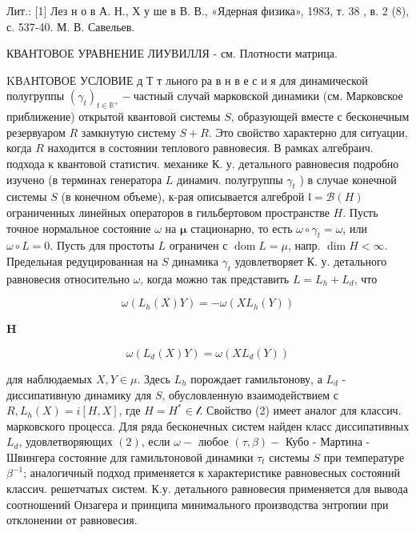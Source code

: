 \documentclass[10pt]{article}
\begin{document}
Лит.: [1] Лез н о в А. Н., Х у ше в В. В., «Ядерная физика», 1983, т. 38 , в. 2 (8), с. 537-40. М. В. Савельев.



КВАНТОВОЕ УРАВНЕНИЕ ЛИУВИЛЛЯ - см. Плотности матрица.



KВAНТОВОЕ УСЛОВИЕ д Т т льного ра в н в е с и я для динамической полугруппы $\left(\gamma_{t}\right)_{t \in \mathbb{R}^{+}}-$частный случай марковской динамики (см. Марковское приближение) открытой квантовой системы $S$, образующей вместе с бесконечным резервуаром $R$ замкнутую систему $S+R$. Это свойство характерно для ситуации, когда $R$ находится в состоянии теплового равновесия. В рамках алгебраич. подхода к квантовой статистич. механике К. у. детального равновесия подробно изучено (в терминах генератора $L$ динамич. полугруппы $\gamma_{t}$ ) в случае конечной системы $S$ (в конечном объеме), к-рая описывается алгеброй $\mathfrak{l}=\mathscr{B}(H)$ ограниченных линейных операторов в гильбертовом пространстве $H$. Пусть точное нормальное состояние $\omega$ на $\boldsymbol{\mu}$ стационарно, то есть $\omega \circ \gamma_{t}=\omega$, или $\omega \circ L=0$. Пусть для простоты $L$ ограничен с $\operatorname{dom} L=\mathscr{\mu}$, напр. $\operatorname{dim} H<\infty$. Предельная редуцированная на $S$ динамика $\gamma_{t}$ удовлетворяет К. у. детального равновесия относительно $\omega$, когда можно так представить $L=L_{h}+L_{d}$, что



\[

\omega\left(L_{h}(X) Y\right)=-\omega\left(X L_{h}(Y)\right)

\]



$\mathbf{H}$



\[

\omega\left(L_{d}(X) Y\right)=\omega\left(X L_{d}(Y)\right)

\]



для наблюдаемых $X, Y \in \mu$. Здесь $L_{h}$ порождает гамильтонову, а $L_{d}$ - диссипативную динамику для $S$, обусловленную взаимодействием с $R, L_{h}(X)=i[H, X]$, где $H=H^{*} \in \mathscr{l}$. Свойство (2) имеет аналог для классич. марковского процесса. Для ряда бесконечных систем найден класс диссипативных $L_{d}$, удовлетворяющих $(2)$, если $\omega-$ любое $(\tau, \beta)-$ Кубо - Мартина - Швингера состояние для гамильтоновой динамики $\tau_{t}$ системы $S$ при температуре $\beta^{-1}$; аналогичный подход применяется к характеристике равновесных состояний классич. решетчатых систем. К.у. детального равновесия применяется для вывода соотношений Онзагера и принципа минимального производства энтропии при отклонении от равновесия.
\end{document}
